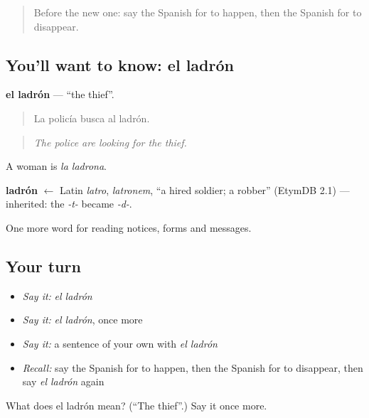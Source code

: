 \label{lesson:ES-C495-ladron}



\begin{quote}
Before the new one: say the Spanish for to happen, then the Spanish for to disappear.
\end{quote}

\subsection*{You'll want to know: el ladrón}
\textbf{el ladrón} — \textquotedblleft{}the thief\textquotedblright{}.

\begin{quote}
La policía busca al ladrón.
\end{quote}

\begin{quote}
\emph{The police are looking for the thief.}
\end{quote}

A woman is \emph{la ladrona}.

\begin{cousinweb}
\textbf{ladrón} $\leftarrow$ Latin \emph{latro}, \emph{latronem}, \textquotedblleft{}a hired soldier; a robber\textquotedblright{} (EtymDB 2.1) — inherited: the \emph{-t-} became \emph{-d-}.
\end{cousinweb}

\begin{grammarlens}[title={What you've built}]
One more word for reading notices, forms and messages.
\end{grammarlens}

\subsection*{Your turn}
\begin{itemize}
\raggedright
  \item \emph{Say it:} \emph{el ladrón}
  \item \emph{Say it:} \emph{el ladrón}, once more
  \item \emph{Say it:} a sentence of your own with \emph{el ladrón}
  \item \emph{Recall:} say the Spanish for to happen, then the Spanish for to disappear, then say \emph{el ladrón} again
\end{itemize}

\begin{tcolorbox}[breakable,colback=teal!4,colframe=teal!35!black,title={Before you move on}]
What does el ladrón mean? (\textquotedblleft{}The thief\textquotedblright{}.) Say it once more.
\end{tcolorbox}
